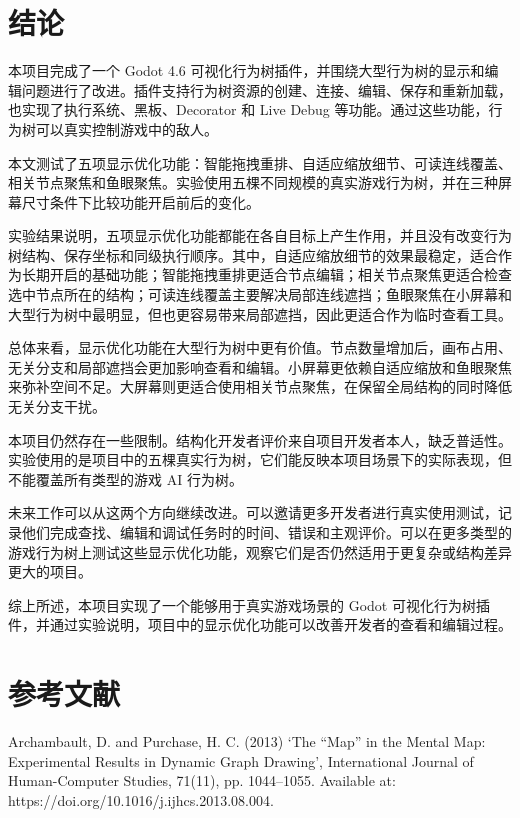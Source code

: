 \documentclass[11pt,a4paper,oneside,extrafontsizes]{memoir}
\begin{document}
\chapter{结论}

本项目完成了一个 Godot 4.6 可视化行为树插件，并围绕大型行为树的显示和编辑问题进行了改进。插件支持行为树资源的创建、连接、编辑、保存和重新加载，也实现了执行系统、黑板、Decorator 和 Live Debug 等功能。通过这些功能，行为树可以真实控制游戏中的敌人。

本文测试了五项显示优化功能：智能拖拽重排、自适应缩放细节、可读连线覆盖、相关节点聚焦和鱼眼聚焦。实验使用五棵不同规模的真实游戏行为树，并在三种屏幕尺寸条件下比较功能开启前后的变化。

实验结果说明，五项显示优化功能都能在各自目标上产生作用，并且没有改变行为树结构、保存坐标和同级执行顺序。其中，自适应缩放细节的效果最稳定，适合作为长期开启的基础功能；智能拖拽重排更适合节点编辑；相关节点聚焦更适合检查选中节点所在的结构；可读连线覆盖主要解决局部连线遮挡；鱼眼聚焦在小屏幕和大型行为树中最明显，但也更容易带来局部遮挡，因此更适合作为临时查看工具。

总体来看，显示优化功能在大型行为树中更有价值。节点数量增加后，画布占用、无关分支和局部遮挡会更加影响查看和编辑。小屏幕更依赖自适应缩放和鱼眼聚焦来弥补空间不足。大屏幕则更适合使用相关节点聚焦，在保留全局结构的同时降低无关分支干扰。

本项目仍然存在一些限制。结构化开发者评价来自项目开发者本人，缺乏普适性。实验使用的是项目中的五棵真实行为树，它们能反映本项目场景下的实际表现，但不能覆盖所有类型的游戏 AI 行为树。

未来工作可以从这两个方向继续改进。可以邀请更多开发者进行真实使用测试，记录他们完成查找、编辑和调试任务时的时间、错误和主观评价。可以在更多类型的游戏行为树上测试这些显示优化功能，观察它们是否仍然适用于更复杂或结构差异更大的项目。

综上所述，本项目实现了一个能够用于真实游戏场景的 Godot 可视化行为树插件，并通过实验说明，项目中的显示优化功能可以改善开发者的查看和编辑过程。

\chapter*{参考文献}

Archambault, D. and Purchase, H. C. (2013) ‘The “Map” in the Mental Map: Experimental Results in Dynamic Graph Drawing’, International Journal of Human-Computer Studies, 71(11), pp. 1044–1055. Available at: https://doi.org/10.1016/j.ijhcs.2013.08.004.
\end{document}
